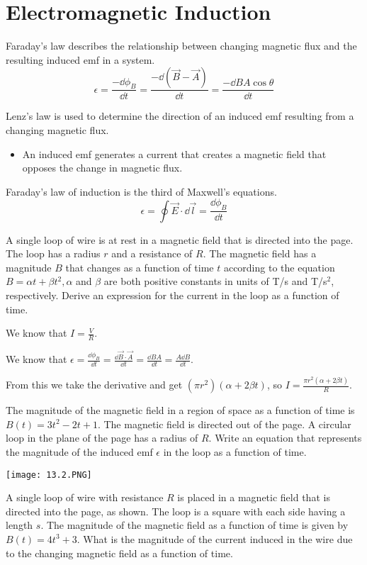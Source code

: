 \documentclass[../em.tex]{subfiles}
\begin{document}
\section{Electromagnetic Induction}
Faraday's law describes the relationship between changing magnetic flux and the resulting induced emf in a system.
\[\epsilon = \frac{-\dd\phi_B}{\dd t} = \frac{-\dd(\vec{B}-\vec{A})}{\dd t} = \frac{-\dd BA\cos\theta}{\dd t}\]

Lenz's law is used to determine the direction of an induced emf resulting from a changing magnetic flux.
\begin{itemize}
    \item An induced emf generates a current that creates a magnetic field that opposes the change in magnetic flux.
\end{itemize}

Faraday's law of induction is the third of Maxwell's equations.
\[ \epsilon = \oint \vec{E}\cdot\dd \vec{l} = \frac{\dd \phi_B}{\dd t}\]

\begin{example}
    A single loop of wire is at rest in a magnetic field that is directed into the page. The loop has a radius $r$ and a resistance of $R$. The magnetic field has a magnitude $B$ that changes 
    as a function of time $t$ according to the equation $B=\alpha t+\beta t^2, \alpha$ and $\beta$ are both positive constants in units of T/s and T/s$^2$, respectively. Derive an expression for the current in the loop as a function of time.

    We know that $I=\frac{V}{R}$.

    We know that $\epsilon = \frac{\dd \phi_B}{\dd t}=\frac{\dd \vec{B}\cdot \vec{A}}{\dd t}=\frac{\dd BA}{\dd t}=\frac{A\dd B}{\dd t}$.

    From this we take the derivative and get $(\pi r^2)(\alpha + 2\beta t)$, so $I=\frac{\pi r^2(\alpha +2\beta t)}{R}$.
\end{example}

\ex The magnitude of the magnetic field in a region of space as a function of time is $B(t)=3t^2-2t+1$. The magnetic field is directed out of the page. A circular loop in the plane of the page has a radius of $R$.
Write an equation that represents the magnitude of the induced emf $\epsilon$ in the loop as a function of time.

\pagebreak
\ex \begin{center}
    \texttt{[image: 13.2.PNG]}
\end{center}
A single loop of wire with resistance $R$ is placed in a magnetic field that is directed into the page, as shown. The loop is a square with each side having a length $s$. The magnitude 
of the magnetic field as a function of time is given by $B(t)=4t^3+3$. What is the magnitude of the current induced in the wire due to the changing magnetic field as a function of time.
\end{document}

